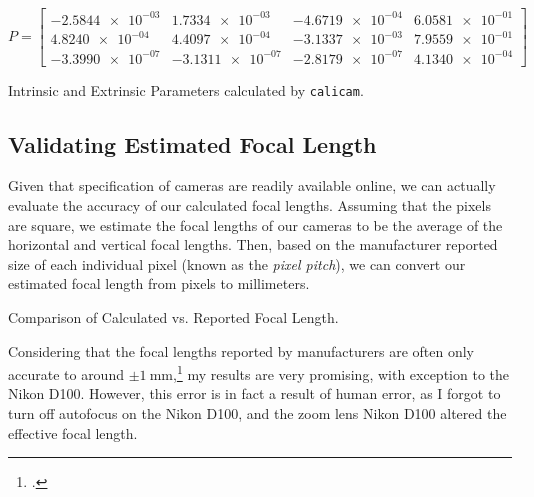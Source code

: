 \begin{equation*}
    P =
    \begin{bmatrix}
        \num{-2.5844e-03} & \num{1.7334e-03}  & \num{-4.6719e-04} & \num{6.0581e-01} \\
        \num{4.8240e-04}  & \num{4.4097e-04}  & \num{-3.1337e-03} & \num{7.9559e-01} \\
        \num{-3.3990e-07} & \num{-3.1311e-07} & \num{-2.8179e-07} & \num{4.1340e-04}
    \end{bmatrix}
\end{equation*}

\begin{table}[H]
    \centering
    
    \caption{Intrinsic and Extrinsic Parameters calculated by \texttt{calicam}.}
\end{table}

\subsection{Validating Estimated Focal Length}
Given that specification of cameras are readily available online, we can actually evaluate the accuracy of our calculated focal lengths. Assuming that the pixels are square, we estimate the focal lengths of our cameras to be the average of the horizontal and vertical focal lengths. Then, based on the manufacturer reported size of each individual pixel (known as the \emph{pixel pitch}), we can convert our estimated focal length from pixels to millimeters.

\begin{table}[H]
    \centering
    
    \caption{Comparison of Calculated vs. Reported Focal Length.}
\end{table}

Considering that the focal lengths reported by manufacturers are often only accurate to around $\pm \qty{1}{\milli\meter}$,\footcite{waynefAnswerAre2017} my results are very promising, with exception to the Nikon D100. However, this error is in fact a result of human error, as I forgot to turn off autofocus on the Nikon D100, and the zoom lens Nikon D100 altered the effective focal length. 


